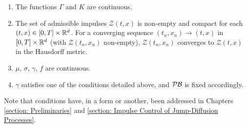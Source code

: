 \begin{assumption}
    \label{ass: Assumption 2.1 in Seydel}
    \begin{enumerate}[label=(\textup{V}\arabic*), ref=(\textup{V}\arabic*)]
        \item \label{ass: V1} The functions $\Gamma$ and $K$ are continuous.
        \item \label{ass: V2} The set of admissible impulses $\mathcal{Z}(t,x)$ is non-empty and compact for each $(t,x) \in [0,T] \times \mathbb{R}^d$. For a converging sequence $(t_n,x_n) \rightarrow (t,x)$ in $[0,T] \times \mathbb{R}^d$ (with $\mathcal{Z}(t_n,x_n)$ non-empty), $\mathcal{Z}(t_n,x_n)$ converges to $\mathcal{Z}(t,x)$ in the Hausdorff metric.
        \item \label{ass: V3} $\mu$, $\sigma$, $\gamma$, $f$ are continuous.
        \item \label{ass: V4} $\gamma$ satisfies one of the conditions detailed above, and $\mathcal{PB}$ is fixed accordingly.
    \end{enumerate}
\end{assumption}
\begin{remark}
    Note that conditions  have, in a form or another, been addressed in Chapters \ref{section: Preliminaries} and \ref{section: Impulse Control of Jump-Diffusion Processes}.
\end{remark}

